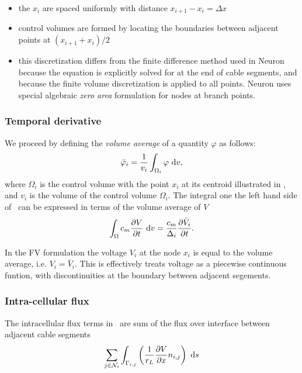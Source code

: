 \begin{itemize}
    \item   the $x_i$ are spaced uniformly with distance $x_{i+1}-x_{i} = \Delta x$
    \item   control volumes are formed by locating the boundaries between adjacent points at $(x_{i+1}+x_{i})/2$
    \item   this discretization differs from the finite difference method used in Neuron because the equation is explicitly solved for at the end of cable segments, and because the finite volume discretization is applied to all points. Neuron uses special algebraic \emph{zero area} formulation for nodes at branch points.
\end{itemize}

\subsubsection{Temporal derivative}
We proceed by defining the \emph{volume average} of a quantity $\varphi$ as follows:
\begin{equation}
    \bar{\varphi}_i = \frac{1}{v_i} \int_{\Omega_i}{\varphi}~\text{d}{v},
\end{equation}
where $\Omega_i$ is the control volume with the point $x_i$ at its centroid illustrated in , and $v_i$ is the volume of the control volume $\Omega_i$.
The integral one the left hand side of~ can be expressed in terms of the volume average of $V$
\begin{equation}
    \int_{\Omega}{c_m \frac{\partial{V}}{\partial{t}} } ~\text{d}{v} = \frac{c_m}{\Delta_i} \frac{\partial{\bar{V}_i}}{\partial{t}}.
\end{equation}

In the FV formulation the voltage $V_i$ at the node $x_i$ is equal to the volume average, i.e. $V_i=\bar{V}_i$.
This is effectively treats voltage as a piecewise continuous funtion, with discontinuities at the boundary between adjacent segements.

\subsubsection{Intra-cellular flux}
The intracellular flux terms in~ are sum of the flux over interface between adjacent cable segments
\begin{equation}
    \sum_{j\in\mathcal{N}_i} {\int_{\Gamma_{i,j}}  \left( \frac{1}{r_L}\frac{\partial{V}}{\partial{x}} n_{i,j} \right) ~\text{d}{s} }
\end{equation}

